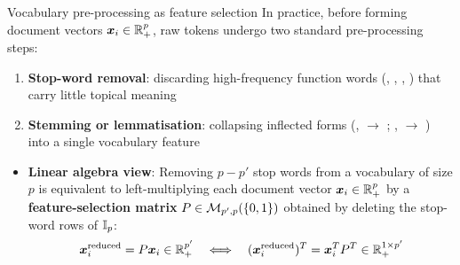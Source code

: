 \documentclass[aspectratio=169]{beamer}\usepackage[]{graphicx}\usepackage[]{xcolor}
\begin{document}
\begin{frame}{Vocabulary pre-processing as feature selection}
In practice, before forming document vectors $\bm{x}_i \in \mathbb{R}_+^p$, raw tokens undergo two standard pre-processing steps:
\vfill
\begin{enumerate}
\item \textbf{Stop-word removal}: discarding high-frequency function words (, , , ) that carry little topical meaning
\item \textbf{Stemming or lemmatisation}: collapsing inflected forms (,  $\to$ ; ,  $\to$ ) into a single vocabulary feature
\end{enumerate}
\vfill
\begin{itemize}
\item \textbf{Linear algebra view}: Removing $p - p'$ stop words from a vocabulary of size $p$ is equivalent to left-multiplying each document vector $\bm{x}_i \in \mathbb{R}_+^p$ by a \textbf{feature-selection matrix} $P \in \mathcal{M}_{p', p}(\{0, 1\})$ obtained by deleting the stop-word rows of $\mathbb{I}_p$:
\[
\bm{x}_i^{\text{reduced}} = P \bm{x}_i \in \mathbb{R}_+^{p'} \quad\Longleftrightarrow\quad (\bm{x}_i^{\text{reduced}})^T = \bm{x}_i^T P^T \in \mathbb{R}_+^{1 \times p'}
\]
\end{itemize}
\end{frame}



\end{document}
